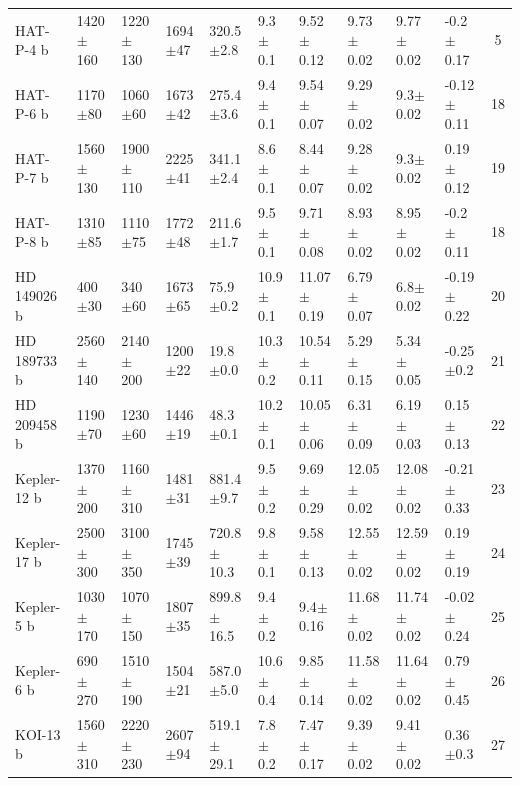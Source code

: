 \begin{subappendices}
{\begin{landscape}
\begin{longtable}{llllllllllc}
  HAT-P-4 b   &    1420$\pm$160 &    1220$\pm$130 &   1694$\pm$47 &    320.5$\pm$2.8 &   9.3$\pm$0.1 &   9.52$\pm$0.12 &   9.73$\pm$0.02 &   9.77$\pm$0.02 &   -0.2$\pm$0.17 &        5 \\
  HAT-P-6 b   &     1170$\pm$80 &     1060$\pm$60 &   1673$\pm$42 &    275.4$\pm$3.6 &   9.4$\pm$0.1 &   9.54$\pm$0.07 &   9.29$\pm$0.02 &    9.3$\pm$0.02 &  -0.12$\pm$0.11 &       18 \\
  HAT-P-7 b   &    1560$\pm$130 &    1900$\pm$110 &   2225$\pm$41 &    341.1$\pm$2.4 &   8.6$\pm$0.1 &   8.44$\pm$0.07 &   9.28$\pm$0.02 &    9.3$\pm$0.02 &   0.19$\pm$0.12 &       19 \\
  HAT-P-8 b   &     1310$\pm$85 &     1110$\pm$75 &   1772$\pm$48 &    211.6$\pm$1.7 &   9.5$\pm$0.1 &   9.71$\pm$0.08 &   8.93$\pm$0.02 &   8.95$\pm$0.02 &   -0.2$\pm$0.11 &       18 \\
  HD 149026 b &      400$\pm$30 &      340$\pm$60 &   1673$\pm$65 &     75.9$\pm$0.2 &  10.9$\pm$0.1 &  11.07$\pm$0.19 &   6.79$\pm$0.07 &    6.8$\pm$0.02 &  -0.19$\pm$0.22 &       20 \\
  HD 189733 b &    2560$\pm$140 &    2140$\pm$200 &   1200$\pm$22 &     19.8$\pm$0.0 &  10.3$\pm$0.2 &  10.54$\pm$0.11 &   5.29$\pm$0.15 &   5.34$\pm$0.05 &   -0.25$\pm$0.2 &       21 \\
  HD 209458 b &     1190$\pm$70 &     1230$\pm$60 &   1446$\pm$19 &     48.3$\pm$0.1 &  10.2$\pm$0.1 &  10.05$\pm$0.06 &   6.31$\pm$0.09 &   6.19$\pm$0.03 &   0.15$\pm$0.13 &       22 \\
  Kepler-12 b &    1370$\pm$200 &    1160$\pm$310 &   1481$\pm$31 &    881.4$\pm$9.7 &   9.5$\pm$0.2 &   9.69$\pm$0.29 &  12.05$\pm$0.02 &  12.08$\pm$0.02 &  -0.21$\pm$0.33 &       23 \\
  Kepler-17 b &    2500$\pm$300 &    3100$\pm$350 &   1745$\pm$39 &   720.8$\pm$10.3 &   9.8$\pm$0.1 &   9.58$\pm$0.13 &  12.55$\pm$0.02 &  12.59$\pm$0.02 &   0.19$\pm$0.19 &       24 \\
  Kepler-5 b  &    1030$\pm$170 &    1070$\pm$150 &   1807$\pm$35 &   899.8$\pm$16.5 &   9.4$\pm$0.2 &    9.4$\pm$0.16 &  11.68$\pm$0.02 &  11.74$\pm$0.02 &  -0.02$\pm$0.24 &       25 \\
  Kepler-6 b  &     690$\pm$270 &    1510$\pm$190 &   1504$\pm$21 &    587.0$\pm$5.0 &  10.6$\pm$0.4 &   9.85$\pm$0.14 &  11.58$\pm$0.02 &  11.64$\pm$0.02 &   0.79$\pm$0.45 &       26 \\
  KOI-13 b    &    1560$\pm$310 &    2220$\pm$230 &   2607$\pm$94 &   519.1$\pm$29.1 &   7.8$\pm$0.2 &   7.47$\pm$0.17 &   9.39$\pm$0.02 &   9.41$\pm$0.02 &    0.36$\pm$0.3 &       27 \\

\end{longtable}
\end{landscape}}
\end{subappendices}
